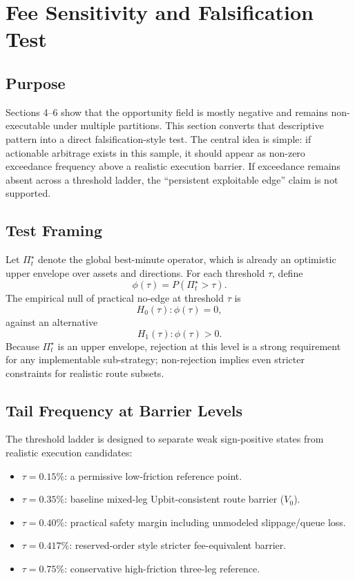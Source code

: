 \documentclass[11pt,a4paper]{article}
\begin{document}
\section{Fee Sensitivity and Falsification Test}
\subsection{Purpose}
Sections 4--6 show that the opportunity field is mostly negative and remains non-executable under multiple partitions. This section converts that descriptive pattern into a direct falsification-style test. The central idea is simple: if actionable arbitrage exists in this sample, it should appear as non-zero exceedance frequency above a realistic execution barrier. If exceedance remains absent across a threshold ladder, the ``persistent exploitable edge'' claim is not supported.

\subsection{Test Framing}
Let $\Pi^{\star}_{t}$ denote the global best-minute operator, which is already an optimistic upper envelope over assets and directions. For each threshold $\tau$, define
\begin{equation}
\phi(\tau) = P\!\left(\Pi^{\star}_{t} > \tau\right).
\end{equation}
The empirical null of practical no-edge at threshold $\tau$ is
\begin{equation}
H_0(\tau): \phi(\tau)=0,
\end{equation}
against an alternative
\begin{equation}
H_1(\tau): \phi(\tau)>0.
\end{equation}
Because $\Pi^\star_t$ is an upper envelope, rejection at this level is a strong requirement for any implementable sub-strategy; non-rejection implies even stricter constraints for realistic route subsets.

\subsection{Tail Frequency at Barrier Levels}
\noindent The threshold ladder is designed to separate weak sign-positive states from realistic execution candidates:
\begin{itemize}
    \item $\tau=0.15\%$: a permissive low-friction reference point.
    \item $\tau=0.35\%$: baseline mixed-leg Upbit-consistent route barrier ($V_0$).
    \item $\tau=0.40\%$: practical safety margin including unmodeled slippage/queue loss.
    \item $\tau=0.417\%$: reserved-order style stricter fee-equivalent barrier.
    \item $\tau=0.75\%$: conservative high-friction three-leg reference.
\end{itemize}
\end{document}
